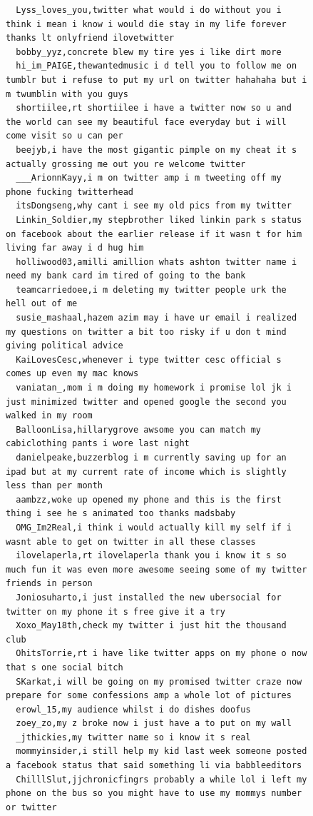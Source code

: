\begin{figure}[htpb]
\begin{verbatim}
  Lyss_loves_you,twitter what would i do without you i think i mean i know i would die stay in my life forever thanks lt onlyfriend ilovetwitter
  bobby_yyz,concrete blew my tire yes i like dirt more
  hi_im_PAIGE,thewantedmusic i d tell you to follow me on tumblr but i refuse to put my url on twitter hahahaha but i m twumblin with you guys
  shortiilee,rt shortiilee i have a twitter now so u and the world can see my beautiful face everyday but i will come visit so u can per
  beejyb,i have the most gigantic pimple on my cheat it s actually grossing me out you re welcome twitter
  ___ArionnKayy,i m on twitter amp i m tweeting off my phone fucking twitterhead
  itsDongseng,why cant i see my old pics from my twitter
  Linkin_Soldier,my stepbrother liked linkin park s status on facebook about the earlier release if it wasn t for him living far away i d hug him
  holliwood03,amilli amillion whats ashton twitter name i need my bank card im tired of going to the bank
  teamcarriedoee,i m deleting my twitter people urk the hell out of me
  susie_mashaal,hazem azim may i have ur email i realized my questions on twitter a bit too risky if u don t mind giving political advice
  KaiLovesCesc,whenever i type twitter cesc official s comes up even my mac knows
  vaniatan_,mom i m doing my homework i promise lol jk i just minimized twitter and opened google the second you walked in my room
  BalloonLisa,hillarygrove awsome you can match my cabiclothing pants i wore last night
  danielpeake,buzzerblog i m currently saving up for an ipad but at my current rate of income which is slightly less than per month
  aambzz,woke up opened my phone and this is the first thing i see he s animated too thanks madsbaby
  OMG_Im2Real,i think i would actually kill my self if i wasnt able to get on twitter in all these classes
  ilovelaperla,rt ilovelaperla thank you i know it s so much fun it was even more awesome seeing some of my twitter friends in person
  Joniosuharto,i just installed the new ubersocial for twitter on my phone it s free give it a try
  Xoxo_May18th,check my twitter i just hit the thousand club
  OhitsTorrie,rt i have like twitter apps on my phone o now that s one social bitch
  SKarkat,i will be going on my promised twitter craze now prepare for some confessions amp a whole lot of pictures
  erowl_15,my audience whilst i do dishes doofus
  zoey_zo,my z broke now i just have a to put on my wall
  _jthickies,my twitter name so i know it s real
  mommyinsider,i still help my kid last week someone posted a facebook status that said something li via babbleeditors
  ChilllSlut,jjchronicfingrs probably a while lol i left my phone on the bus so you might have to use my mommys number or twitter

\end{verbatim}
\end{figure}
